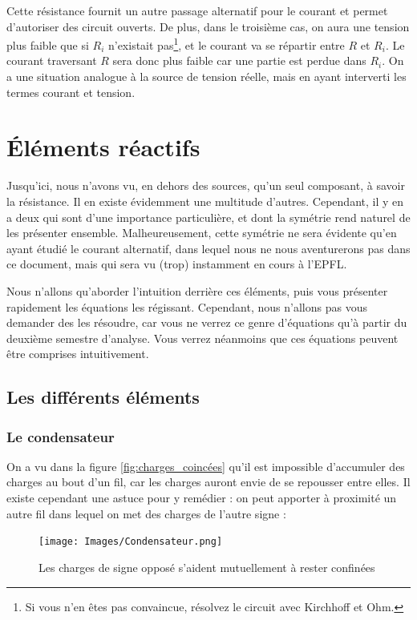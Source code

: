 \documentclass{article}
\newcommand{\inc}{\fontfamily{cmr}\selectfont\textperiodcentered}
\begin{document}
Cette résistance fournit un autre passage alternatif pour le courant et permet d'autoriser des circuit ouverts. De plus, dans le troisième cas, on aura une tension plus faible que si $R_i$ n'existait pas\footnote{Si vous n'en êtes pas convaincu\inc{}e, résolvez le circuit avec Kirchhoff et Ohm.}, et le courant va se répartir entre $R$ et $R_i$. Le courant traversant $R$ sera donc plus faible car une partie est perdue dans $R_i$. On a une situation analogue à la source de tension réelle, mais en ayant interverti les termes courant et tension.

\section{Éléments réactifs} \label{sec:réac}

Jusqu'ici, nous n'avons vu, en dehors des sources, qu'un seul composant, à savoir la résistance. Il en existe évidemment une multitude d'autres. Cependant, il y en a deux qui sont d'une importance particulière, et dont la symétrie rend naturel de les présenter ensemble. Malheureusement, cette symétrie ne sera évidente qu'en ayant étudié le courant alternatif, dans lequel nous ne nous aventurerons pas dans ce document, mais qui sera vu (trop) instamment en cours à l'EPFL.

Nous n'allons qu'aborder l'intuition derrière ces éléments, puis vous présenter rapidement les équations les régissant. Cependant, nous n'allons pas vous demander des les résoudre, car vous ne verrez ce genre d'équations qu'à partir du deuxième semestre d'analyse. Vous verrez néanmoins que ces équations peuvent être comprises intuitivement.

\subsection{Les différents éléments}

\subsubsection{Le condensateur}

On a vu dans la figure \ref{fig:charges_coincées} qu'il est impossible d'accumuler des charges au bout d'un fil, car les charges auront envie de se repousser entre elles. Il existe cependant une astuce pour y remédier : on peut apporter à proximité un autre fil dans lequel on met des charges de l'autre signe :

\begin{figure}[h]
    \centering
    \texttt{[image: Images/Condensateur.png]}
    \caption{Les charges de signe opposé s'aident mutuellement à rester confinées}
\end{figure}
\end{document}
